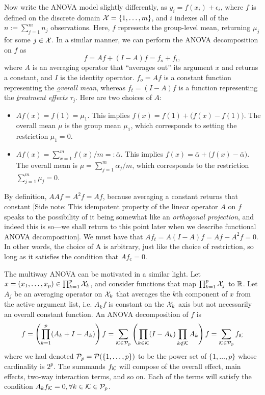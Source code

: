 \documentclass[a4paper,showframe,11pt,draft]{report}
\begin{document}
Now write the ANOVA model slightly differently, as $y_{i} = f(x_i) + \epsilon_{i}$, where $f$ is defined on the discrete domain ${\mathcal X} = \{1,\dots,m\}$, and $i$ indexes all of the $n := \sum_{j=1}^m n_j$ observations.
Here, $f$ represents the group-level mean, returning $\mu_j$ for some $j\in{\mathcal X}$.
In a similar manner, we can perform the ANOVA decomposition on $f$ as
\[
  f = Af + (I-A)f = f_o + f_t,
\]
where $A$ is an averaging operator that ``averages out'' its argument $x$ and returns a constant, and $I$ is the identity operator.
$f_o = Af$ is a constant function representing the \textit{\underline{o}verall mean}, whereas $f_t = (I - A)f$ is a function representing the \textit{\underline{t}reatment effects} $\tau_j$.
Here are two choices of $A$:
\begin{itemize}
  \item $Af(x) = f(1) = \mu_1$. This implies $f(x) = f(1) + \big(f(x) - f(1)\big)$. The overall mean $\mu$ is the group mean $\mu_1$, which corresponds to setting the restriction $\mu_1=0$.
  \item $Af(x) = \sum_{x=1}^m f(x) / m =: \bar \alpha$. This implies $f(x) = \bar \alpha + \big( f(x) - \bar \alpha \big)$. The overall mean is $\mu = \sum_{j=1}^m \alpha_j/m$, which corresponds to the restriction $\sum_{j=1}^m \mu_j = 0$.
\end{itemize}
By definition, $AAf = A^2f = Af$, because averaging a constant returns that constant
[Side note: This idempotent property of the linear operator $A$ on $f$ speaks to the possibility of it being somewhat like an \emph{orthogonal projection}, and indeed this is so---we shall return to this point later when we describe functional ANOVA decomposition].
We must have that $Af_t = A(I - A)f = Af - A^2f = 0$.
In other words, the choice of A is arbitrary, just like the choice of restriction, so long as it satisfies the condition that $Af_c = 0$.

The multiway ANOVA can be motivated in a similar light. 
Let $x = (x_1,\dots,x_p) \in \prod_{k=1}^p {\mathcal X}_k$, and consider functions that map $\prod_{k=1}^p {\mathcal X}_j$ to $\mathbb{R}$.
Let $A_j$ be an averaging operator on ${\mathcal X}_k$ that averages the $k$th component of $x$ from the active argument list, i.e. $A_kf$ is constant on the ${\mathcal X}_k$ axis but not necessarily an overall constant function.
An ANOVA decomposition of $f$ is
\[
  f = \left( \prod_{k=1}^p (A_k + I - A_k) \right)f = \sum_{{\mathcal K}\in{\mathcal P}_p} \left( \prod_{k\in{\mathcal K}} (I - A_k) \prod_{k\notin{\mathcal K}} A_k \right)f = \sum_{{\mathcal K}\in{\mathcal P}_p} f_{\mathcal K}
\]
where we had denoted ${\mathcal P}_p = {\mathcal P}(\{1,\dots,p\})$ to be the power set of $\{1,\dots,p\}$ whose cardinality is $2^p$.
The summands $f_{\mathcal K}$ will compose of the overall effect, main effects, two-way interaction terms, and so on.
Each of the terms will satisfy the condition $A_kf_{\mathcal K} = 0, \forall k \in {\mathcal K} \in {\mathcal P}_p$.
\end{document}
